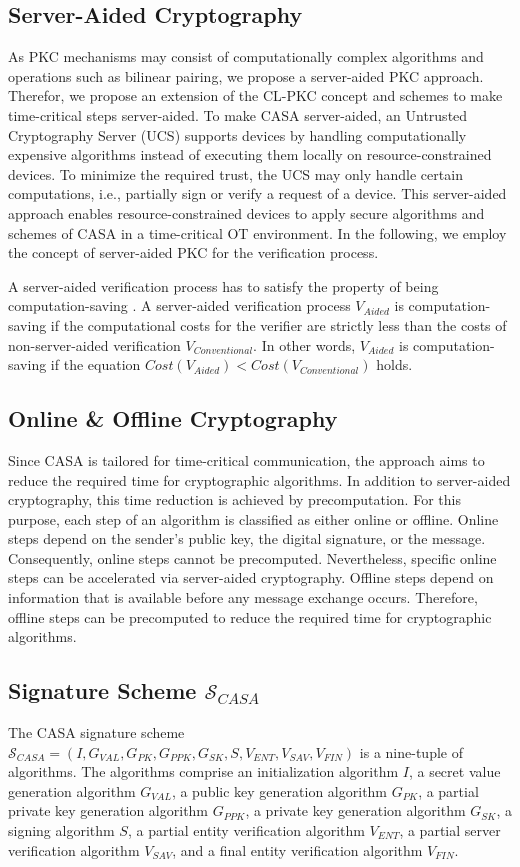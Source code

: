 \subsection{Server-Aided Cryptography}
As PKC mechanisms may consist of computationally complex algorithms and operations such as bilinear pairing, we propose a server-aided PKC approach.
Therefor, we propose an extension of the CL-PKC concept and schemes to make time-critical steps server-aided.
To make CASA server-aided, an Untrusted Cryptography Server (UCS) supports devices by handling computationally expensive algorithms instead of executing them locally on resource-constrained devices.
To minimize the required trust, the UCS may only handle certain computations, i.e., partially sign or verify a request of a device.
This server-aided approach enables resource-constrained devices to apply secure algorithms and schemes of CASA in a time-critical OT environment.
In the following, we employ the concept of server-aided PKC for the verification process.

A server-aided verification process has to satisfy the property of being computation-saving \cite{Wu2008}.
A server-aided verification process $V_{Aided}$ is computation-saving if the computational costs for the verifier are strictly less than the costs of non-server-aided verification $V_{Conventional}$.
In other words, $V_{Aided}$ is computation-saving if the equation $Cost(V_{Aided}) < Cost(V_{Conventional})$ holds.

\subsection{Online \& Offline Cryptography}
Since CASA is tailored for time-critical communication, the approach aims to reduce the required time for cryptographic algorithms.
In addition to server-aided cryptography, this time reduction is achieved by precomputation.
For this purpose, each step of an algorithm is classified as either online or offline.
Online steps depend on the sender's public key, the digital signature, or the message.
Consequently, online steps cannot be precomputed.
Nevertheless, specific online steps can be accelerated via server-aided cryptography.
Offline steps depend on information that is available before any message exchange occurs.
Therefore, offline steps can be precomputed to reduce the required time for cryptographic algorithms.

\subsection{Signature Scheme $\mathcal{S}_{CASA}$}
The CASA signature scheme $\mathcal{S}_{CASA} = (I, G_{VAL}, G_{PK}, G_{PPK}, G_{SK}, S, V_{ENT}, V_{SAV}, V_{FIN})$ is a nine-tuple of algorithms.
The algorithms comprise an initialization algorithm $I$, a secret value generation algorithm $G_{VAL}$, a public key generation algorithm $G_{PK}$, a partial private key generation algorithm $G_{PPK}$, a private key generation algorithm $G_{SK}$, a signing algorithm $S$, a partial entity verification algorithm $V_{ENT}$, a partial server verification algorithm $V_{SAV}$, and a final entity verification algorithm $V_{FIN}$.

